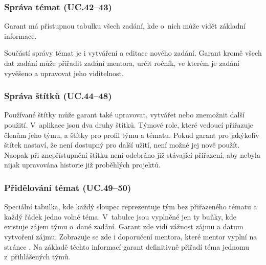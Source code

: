\documentclass[czech,BP]{thesiskiv}
\begin{document}
			\subsubsection{Správa témat (UC.42--43)}
			\par Garant má přístupnou tabulku všech zadání, kde o~nich může vidět základní informace. 
			\par Součástí správy témat je i vytváření a editace nového zadání. Garant kromě všech dat zadání může přiřadit zadání mentora, určit ročník, ve kterém je zadání vyvěšeno a upravovat jeho viditelnost.
			\subsubsection{Správa štítků (UC.44--48)}
			\par Používané štítky může garant také upravovat, vytvářet nebo znemožnit další použití. V~aplikace jsou dva druhy štítků. Týmové role, které vedoucí přiřazuje členům jeho týmu, a štítky pro profil týmu a tématu. Pokud garant pro jakýkoliv štítek nastaví, že není dostupný pro další užití, není možné jej nově použít. Naopak při znepřístupnění štítku není odebráno již stávající přiřazení, aby nebyla nijak upravována historie již proběhlých projektů.
			\subsubsection{Přidělování témat (UC.49--50)}
			\par Speciální tabulka, kde každý sloupec reprezentuje tým bez přiřazeného tématu a každý řádek jedno volné téma. V~tabulce jsou vyplněné jen ty buňky, kde existuje zájem týmu o~dané zadání. Garant zde vidí vážnost zájmu a datum vytvoření zájmu. Zobrazuje se zde i doporučení mentora, které mentor vyplní na stránce . Na základě těchto informací garant definitivně přiřadí téma jednomu z~přihlášených týmů.
\end{document}
